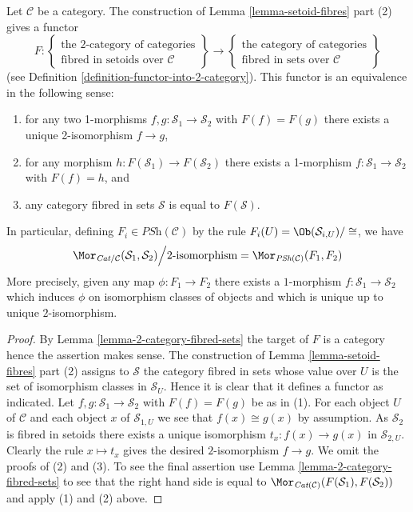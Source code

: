 \begin{lemma}
\label{lemma-2-category-fibred-setoids}
Let $\mathcal{C}$ be a category. The construction of
Lemma \ref{lemma-setoid-fibres}
part (2) gives a functor
$$
F :
\left\{
\begin{matrix}
\text{the 2-category of categories}\\
\text{fibred in setoids over }\mathcal{C}
\end{matrix}
\right\}
\longrightarrow
\left\{
\begin{matrix}
\text{the category of categories}\\
\text{fibred in sets over }\mathcal{C}
\end{matrix}
\right\}
$$
(see
Definition \ref{definition-functor-into-2-category}).
This functor is an equivalence in the following sense:
\begin{enumerate}
\item for any two 1-morphisms $f, g : \mathcal{S}_1 \to \mathcal{S}_2$
with $F(f) = F(g)$ there exists a unique 2-isomorphism $f \to g$,
\item for any morphism $h : F(\mathcal{S}_1) \to F(\mathcal{S}_2)$
there exists a 1-morphism $f : \mathcal{S}_1 \to \mathcal{S}_2$
with $F(f) = h$, and
\item any category fibred in sets $\mathcal{S}$ is equal to $F(\mathcal{S})$.
\end{enumerate}
In particular, defining $F_i \in \textit{PSh}(\mathcal{C})$ by the
rule $F_i(U) = \Ob(\mathcal{S}_{i, U})/\cong$, we have
$$
\Mor_{\textit{Cat}/\mathcal{C}}(\mathcal{S}_1, \mathcal{S}_2)
\Big/
2\text{-isomorphism}
=
\Mor_{\textit{PSh}(\mathcal{C})}(F_1, F_2)
$$
More precisely, given any map $\phi : F_1 \to F_2$ there exists a
$1$-morphism $f : \mathcal{S}_1 \to \mathcal{S}_2$ which induces
$\phi$ on isomorphism classes of objects and
which is unique up to unique $2$-isomorphism.
\end{lemma}

\begin{proof}
By
Lemma \ref{lemma-2-category-fibred-sets}
the target of $F$ is a category hence the assertion makes sense.
The construction of
Lemma \ref{lemma-setoid-fibres} part (2)
assigns to $\mathcal{S}$ the category fibred in sets whose value over
$U$ is the set of isomorphism classes in $\mathcal{S}_U$. Hence it
is clear that it defines a functor as indicated.
Let $f, g : \mathcal{S}_1 \to \mathcal{S}_2$
with $F(f) = F(g)$ be as in (1). For each object $U$ of $\mathcal{C}$
and each object $x$ of $\mathcal{S}_{1, U}$ we see that $f(x) \cong g(x)$
by assumption. As $\mathcal{S}_2$ is fibred in setoids there exists
a unique isomorphism $t_x : f(x) \to g(x)$ in $\mathcal{S}_{2, U}$.
Clearly the rule $x \mapsto t_x$ gives the desired $2$-isomorphism
$f \to g$. We omit the proofs of (2) and (3).
To see the final assertion use
Lemma \ref{lemma-2-category-fibred-sets}
to see that the right hand side is equal to
$\Mor_{\textit{Cat}(\mathcal{C})}(F(\mathcal{S}_1), F(\mathcal{S}_2))$
and apply (1) and (2) above.
\end{proof}

